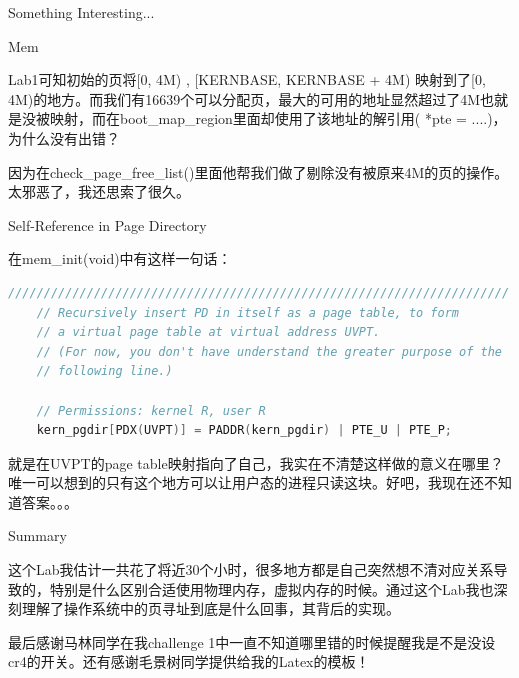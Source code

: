 \documentclass[GBK,winfonts,a4paper,10pt]{ctexart}
\begin{document}
\begin{section}{ Something Interesting... }
\begin{subsection}{ Mem }
\par
 Lab1可知初始的页将[0, 4M) , [KERNBASE, KERNBASE + 4M) 映射到了[0, 4M)的地方。而我们有16639个可以分配页，最大的可用的地址显然超过了4M也就是没被映射，而在boot\_map\_region里面却使用了该地址的解引用( *pte = ....)，为什么没有出错？
\par
因为在check\_page\_free\_list()里面他帮我们做了剔除没有被原来4M的页的操作。 太邪恶了，我还思索了很久。
\end{subsection}

\begin{subsection}{ Self-Reference in Page Directory }
\par
在mem\_init(void)中有这样一句话：
\begin{lstlisting}[language=C]
	//////////////////////////////////////////////////////////////////////
	// Recursively insert PD in itself as a page table, to form
	// a virtual page table at virtual address UVPT.
	// (For now, you don't have understand the greater purpose of the
	// following line.)

	// Permissions: kernel R, user R
	kern_pgdir[PDX(UVPT)] = PADDR(kern_pgdir) | PTE_U | PTE_P;
\end{lstlisting}
\par
就是在UVPT的page table映射指向了自己，我实在不清楚这样做的意义在哪里？唯一可以想到的只有这个地方可以让用户态的进程只读这块。好吧，我现在还不知道答案。。。
\end{subsection}

\end{section}

\begin{section}{ Summary }
\par
这个Lab我估计一共花了将近30个小时，很多地方都是自己突然想不清对应关系导致的，特别是什么区别合适使用物理内存，虚拟内存的时候。通过这个Lab我也深刻理解了操作系统中的页寻址到底是什么回事，其背后的实现。
\par
最后感谢马林同学在我challenge 1中一直不知道哪里错的时候提醒我是不是没设cr4的开关。还有感谢毛景树同学提供给我的Latex的模板！
\end{section}
\end{document}
